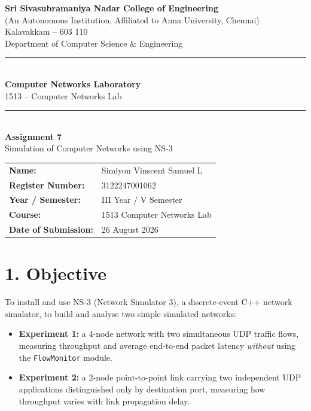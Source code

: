 \documentclass[11pt]{article}
\title{\vspace{-2cm}}
\date{}
\begin{document}
\begin{titlepage}
\centering
\vspace*{1cm}
{\large \textbf{Sri Sivasubramaniya Nadar College of Engineering}}\\
{\small (An Autonomous Institution, Affiliated to Anna University, Chennai)}\\
{\small Kalavakkam -- 603 110}\\[0.3cm]
{\small Department of Computer Science \& Engineering}\\[1.5cm]

\rule{\linewidth}{0.5mm}\\[0.4cm]
{\LARGE \textbf{Computer Networks Laboratory}}\\[0.3cm]
{\Large 1513 -- Computer Networks Lab}\\[0.4cm]
\rule{\linewidth}{0.5mm}\\[1.5cm]

{\huge \textbf{Assignment 7}}\\[0.4cm]
{\Large Simulation of Computer Networks using NS-3}\\[2cm]

\begin{center}
\begin{tabular}{ll}
\textbf{Name:} & Simiyon Vinscent Samuel L \\[0.2cm]
\textbf{Register Number:} & 3122247001062 \\[0.2cm]
\textbf{Year / Semester:} & III Year / V Semester \\[0.2cm]
\textbf{Course:} & 1513 Computer Networks Lab \\[0.2cm]
\textbf{Date of Submission:} & 26 August 2026 \\[0.2cm]
\end{tabular}
\end{center}

\vfill
\end{titlepage}

\section*{1. Objective}
To install and use NS-3 (Network Simulator 3), a discrete-event C++ network
simulator, to build and analyse two simple simulated networks:
\begin{itemize}
  \item \textbf{Experiment 1:} a 4-node network with two simultaneous UDP
        traffic flows, measuring throughput and average end-to-end packet
        latency \emph{without} using the \texttt{FlowMonitor} module.
  \item \textbf{Experiment 2:} a 2-node point-to-point link carrying two
        independent UDP applications distinguished only by destination
        port, measuring how throughput varies with link propagation delay.
\end{itemize}
\end{document}
